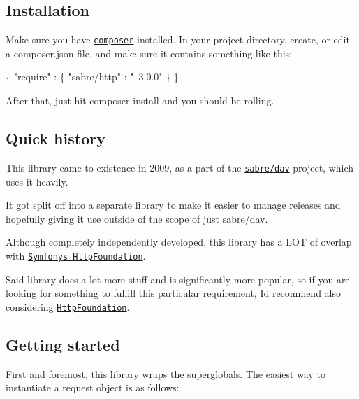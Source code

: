 \subsection*{Installation }

Make sure you have \href{http://getcomposer.org/}{\tt composer} installed. In your project directory, create, or edit a {\ttfamily composer.\+json} file, and make sure it contains something like this\+:


\begin{DoxyCode}
\{
    "require" : \{
        "sabre/http" : "~3.0.0"
    \}
\}
\end{DoxyCode}


After that, just hit {\ttfamily composer install} and you should be rolling.

\subsection*{Quick history }

This library came to existence in 2009, as a part of the \href{http://sabre.io/}{\tt {\ttfamily sabre/dav}} project, which uses it heavily.

It got split off into a separate library to make it easier to manage releases and hopefully giving it use outside of the scope of just {\ttfamily sabre/dav}.

Although completely independently developed, this library has a L\+OT of overlap with \href{https://github.com/symfony/HttpFoundation}{\tt Symfony\textquotesingle{}s {\ttfamily Http\+Foundation}}.

Said library does a lot more stuff and is significantly more popular, so if you are looking for something to fulfill this particular requirement, I\textquotesingle{}d recommend also considering \href{https://github.com/symfony/HttpFoundation}{\tt {\ttfamily Http\+Foundation}}.

\subsection*{Getting started }

First and foremost, this library wraps the superglobals. The easiest way to instantiate a request object is as follows\+:





